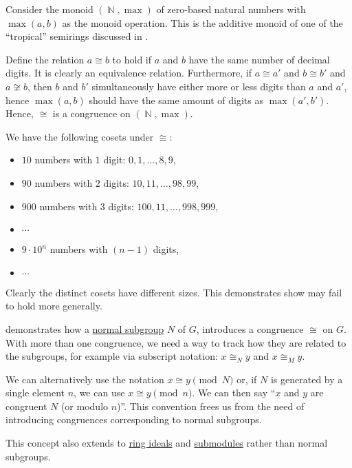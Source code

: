 \begin{example}\label{ex:congruence_with_cosets_of_different_cardinality}
  Consider the monoid \( (\BbbN, \max) \) of zero-based natural numbers with \( \max(a, b) \) as the monoid operation. This is the additive monoid of one of the \enquote{tropical} semirings discussed in .

  Define the relation \( a \cong b \) to hold if \( a \) and \( b \) have the same number of decimal digits. It is clearly an equivalence relation. Furthermore, if \( a \cong a' \) and \( b \cong b' \) and \( a \not\cong b \), then \( b \) and \( b' \) simultaneously have either more or less digits than \( a \) and \( a' \), hence \( \max(a, b) \) should have the same amount of digits as \( \max(a', b') \). Hence, \( {\cong} \) is a congruence on \( (\BbbN, \max) \).

  We have the following cosets under \( {\cong} \):
  \begin{itemize}
    \item \( 10 \) numbers with \( 1 \) digit: \( 0, 1, \ldots, 8, 9 \),
    \item \( 90 \) numbers with \( 2 \) digits: \( 10, 11, \ldots, 98, 99 \),
    \item \( 900 \) numbers with \( 3 \) digits: \( 100, 11, \ldots, 998, 999 \),
    \item \( \cdots \)
    \item \( 9 \cdot 10^n \) numbers with \( (n - 1) \) digits,
    \item \( \cdots \)
  \end{itemize}

  Clearly the distinct cosets have different sizes. This demonstrates show  may fail to hold more generally.
\end{example}

\begin{remark}\label{rem:congruence_modulo_substructure}
   demonstrates how a \hyperref[def:normal_subgroup]{normal subgroup} \( N \) of \( G \), introduces a congruence \( \cong \) on \( G \). With more than one congruence, we need a way to track how they are related to the subgroups, for example via subscript notation: \( x \cong_N y \) and \( x \cong_M y \).

  We can alternatively use the notation \( x \cong y \pmod N \) or, if \( N \) is generated by a single element \( n \), we can use \( x \cong y \pmod n \). We can then say \enquote{\( x \) and \( y \) are congruent  \( N \) (or modulo \( n \))}. This convention frees us from the need of introducing congruences corresponding to normal subgroups.

  This concept also extends to \hyperref[def:semiring_ideal]{ring ideals} and \hyperref[def:module/submodel]{submodules} rather than normal subgroups.
\end{remark}

